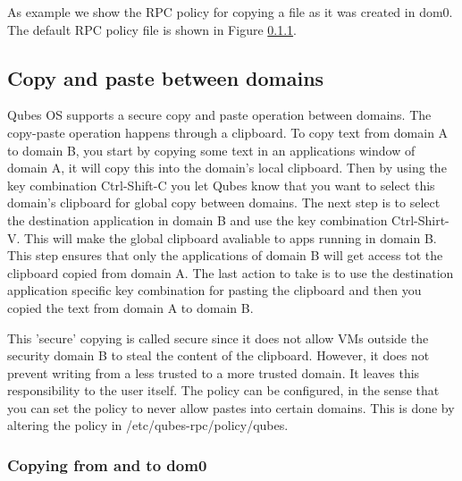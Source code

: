 \documentclass[runningheads,a4paper]{article}
\begin{document}
As example we show the RPC policy for copying a file as it was created
in dom0. The default RPC policy file is shown in Figure \ref{}. 

\subsection{Copy and paste between domains} 

Qubes OS supports a secure
copy and paste operation between domains.  The copy-paste operation
happens through a clipboard.  To copy text from domain A to domain B,
you start by copying some text in an applications window of domain A,
it will copy this into the domain's local clipboard.  Then by using
the key combination Ctrl-Shift-C you let Qubes know that you want to
select this domain's clipboard for global copy between domains.  The
next step is to select the destination application in domain B and use
the key combination Ctrl-Shirt-V.  This will make the global clipboard
avaliable to apps running in domain B.  This step ensures that only
the applications of domain B will get access tot the clipboard copied
from domain A.  The last action to take is to use the destination
application specific key combination for pasting the clipboard and
then you copied the text from domain A to domain B.

 This 'secure' copying is called secure since it does not allow VMs
outside the security domain B to steal the content of the clipboard.
However, it does not prevent writing from a less trusted to a more
trusted domain.  It leaves this responsibility to the user itself.
The policy can be configured, in the sense that you can set the policy
to never allow pastes into certain domains.  This is done by altering
the policy in /etc/qubes-rpc/policy/qubes. 

\subsubsection{Copying from and to dom0} 
\end{document}
